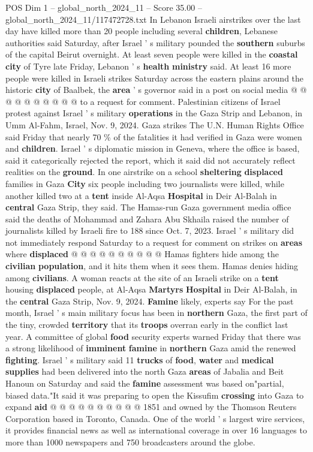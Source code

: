 \begin{textsample}{POS Dim 1 – global\_north\_2024\_11 – Score 35.00 – global\_north\_2024\_11/117472728.txt}
In Lebanon Israeli airstrikes over the last day have killed more than 20 people including several \textbf{children}, Lebanese authorities said Saturday, after Israel ' s military pounded the \textbf{southern} suburbs of the capital Beirut overnight.
At least seven people were killed in the \textbf{coastal} \textbf{city} of Tyre late Friday, Lebanon ' s \textbf{health} \textbf{ministry} said.
At least 16 more people were killed in Israeli strikes Saturday across the eastern plains around the historic \textbf{city} of Baalbek, the \textbf{area} ' s governor said in a post on social media @ @ @ @ @ @ @ @ @ @ to a request for comment.
Palestinian citizens of Israel protest against Israel ' s military \textbf{operations} in the Gaza Strip and Lebanon, in Umm Al-Fahm, Israel, Nov. 9, 2024.
Gaza strikes The U.N.
Human Rights Office said Friday that nearly 70 \% of the fatalities it had verified in Gaza were women and \textbf{children}.
Israel ' s diplomatic mission in Geneva, where the office is based, said it categorically rejected the report, which it said did not accurately reflect realities on the \textbf{ground}.
In one airstrike on a school \textbf{sheltering} \textbf{displaced} families in Gaza \textbf{City} six people including two journalists were killed, while another killed two at a \textbf{tent} inside Al-Aqsa \textbf{Hospital} in Deir Al-Balah in \textbf{central} Gaza Strip, they said.
The Hamas-run Gaza government media office said the deaths of Mohammad and Zahara Abu Skhaila raised the number of journalists killed by Israeli fire to 188 since Oct. 7, 2023.
Israel ' s military did not immediately respond Saturday to a request for comment on strikes on \textbf{areas} where \textbf{displaced} @ @ @ @ @ @ @ @ @ @ Hamas fighters hide among the \textbf{civilian} \textbf{population}, and it hits them when it sees them.
Hamas denies hiding among \textbf{civilians}.
A woman reacts at the site of an Israeli strike on a \textbf{tent} housing \textbf{displaced} people, at Al-Aqsa \textbf{Martyrs} \textbf{Hospital} in Deir Al-Balah, in the \textbf{central} Gaza Strip, Nov. 9, 2024. \textbf{Famine} likely, experts say For the past month, Israel ' s main military focus has been in \textbf{northern} Gaza, the first part of the tiny, crowded \textbf{territory} that its \textbf{troops} overran early in the conflict last year.
A committee of global \textbf{food} security experts warned Friday that there was a strong likelihood of \textbf{imminent} \textbf{famine} in \textbf{northern} Gaza amid the renewed \textbf{fighting}.
Israel ' s military said 11 \textbf{trucks} of \textbf{food}, \textbf{water} and \textbf{medical} \textbf{supplies} had been delivered into the north Gaza \textbf{areas} of Jabalia and Beit Hanoun on Saturday and said the \textbf{famine} assessment was based on"partial, biased data."It said it was preparing to open the Kissufim \textbf{crossing} into Gaza to expand \textbf{aid} @ @ @ @ @ @ @ @ @ @ 1851 and owned by the Thomson Reuters Corporation based in Toronto, Canada.
One of the world ' s largest wire services, it provides financial news as well as international coverage in over 16 languages to more than 1000 newspapers and 750 broadcasters around the globe.


\end{textsample}
